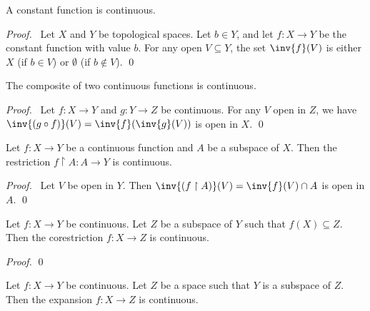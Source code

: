 \begin{theorem}
    A constant function is continuous.
\end{theorem}

\begin{proof}
    \pf\ Let $X$ and $Y$ be topological spaces. Let $b \in Y$, and let $f : X \rightarrow Y$ be the constant
    function with value $b$. For any open $V \subseteq Y$, the set $\inv{f}(V)$ is either $X$ (if $b \in V$)
    or $\emptyset$ (if $b \notin V$). \qed
\end{proof}

\begin{theorem}
    \label{theorem:continuous_composite}
    The composite of two continuous functions is continuous.
\end{theorem}

\begin{proof}
    \pf\ Let $f : X \rightarrow Y$ and $g : Y \rightarrow Z$ be continuous. For any $V$ open in $Z$,
    we have $\inv{(g \circ f)}(V) = \inv{f}(\inv{g}(V))$ is open in $X$. \qed
\end{proof}

\begin{theorem}
    \label{theorem:continuous_restriction}
    Let $f : X \rightarrow Y$ be a continuous function and $A$ be a subspace of $X$. Then the restriction
    $f \restriction A : A \rightarrow Y$ is continuous.
\end{theorem}

\begin{proof}
    \pf\ Let $V$ be open in $Y$. Then $\inv{(f \restriction A)}(V) = \inv{f}(V) \cap A$ is open in $A$. \qed
\end{proof}

\begin{theorem}
    Let $f : X \rightarrow Y$ be continuous. Let $Z$ be a subspace of $Y$ such that $f(X) \subseteq Z$. Then
    the corestriction $f : X \rightarrow Z$ is continuous.
\end{theorem}

\begin{proof}
    \pf
    \qed
\end{proof}

\begin{theorem}
    Let $f : X \rightarrow Y$ be continuous. Let $Z$ be a space such that $Y$ is a subspace of $Z$.
    Then the expansion $f : X \rightarrow Z$ is continuous.
\end{theorem}


